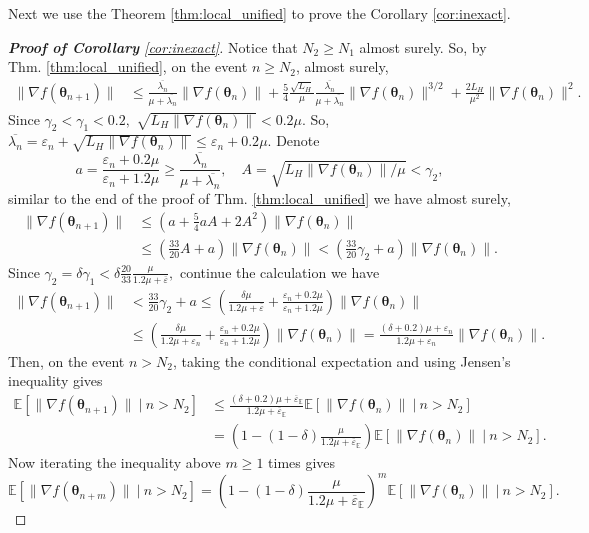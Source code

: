 \documentclass[11pt]{amsart}
\theoremstyle{plain}
\theoremstyle{definition}
\theoremstyle{remark}
\def\E{\mathbb{E}}
\def\eps{\varepsilon}
\def\param{\boldsymbol{\theta}}
\begin{document}
Next we use the Theorem \ref{thm:local_unified} to prove the Corollary \ref{cor:inexact}.
\begin{proof}[\textbf{Proof of Corollary} \ref{cor:inexact}]
Notice that $N_2\geq N_1$ almost surely. So, by Thm. \ref{thm:local_unified}, on the event $n\geq N_2$, almost surely,
\begin{align*}
\|\nabla f(\param_{n+1})\|&\leq \frac{\overline{\lambda_n}}{\mu+\overline{\lambda_n}}\|\nabla f(\param_n)\|+\frac{5}{4}\frac{\sqrt{L_H}}{\mu}\frac{\overline{\lambda_n}}{\mu+\overline{\lambda_n}}\|\nabla f(\param_n)\|^{3/2}+ \frac{2L_H}{\mu^2}\|\nabla f(\param_n)\|^2.
\end{align*}
Since $\gamma_2<\gamma_1<0.2,$ $\sqrt{L_H\|\nabla f(\param_n)\|}<0.2\mu.$ So, $\overline{\lambda_n}=\eps_n+\sqrt{L_H\|\nabla f(\param_n)\|}\leq \eps_n+0.2\mu.$
Denote 
\[
 a=\frac{\eps_n+0.2\mu}{\eps_n+1.2\mu}\geq \frac{\overline{\lambda_n}}{\mu+\overline{\lambda_n}}, \quad  A=\sqrt{L_H\|\nabla f(\param_n)\|/\mu}<\gamma_2,
 \]
 similar to the end of the proof of Thm. \ref{thm:local_unified} we have almost surely,
\begin{align*}
\|\nabla f(\param_{n+1})\|&\leq \left(a+\frac{5}{4}aA+2A^2\right)\|\nabla f(\param_n)\|\\
&\leq (\frac{33}{20}A+a)\|\nabla f(\param_n)\| < (\frac{33}{20}\gamma_2+a)\|\nabla f(\param_n)\|.
\end{align*}
Since $\gamma_2=\delta\gamma_1<\delta\frac{20}{33}\frac{\mu}{1.2\mu+\overline{\eps}},$ continue the calculation we have
\begin{align*}
\|\nabla f(\param_{n+1})\| &< \frac{33}{20}\gamma_2+a 
\leq (\frac{\delta\mu}{1.2\mu+\overline{\eps}}+\frac{\eps_n+0.2\mu}{\eps_n+1.2\mu})\|\nabla f(\param_n)\|\\
&\leq (\frac{\delta\mu}{1.2\mu+{\eps_n}}+\frac{\eps_n+0.2\mu}{\eps_n+1.2\mu})\|\nabla f(\param_n)\| =\frac{(\delta+0.2)\mu+\eps_n}{1.2\mu+\eps_n}\|\nabla f(\param_n)\|.
\end{align*}
Then, on the event $n> N_2$, taking the conditional expectation and using Jensen's inequality gives 
\begin{align*}
\E[\|\nabla f(\param_{n+1})\|\ |\  n>N_2]&\leq \frac{(\delta+0.2)\mu+\overline{\eps}_{\E}}{1.2\mu+\overline{\eps}_{\E}}\E[\|\nabla f(\param_{n})\|\ |\  n>N_2]\\
&=\left(1-(1-\delta)\frac{\mu}{1.2\mu+\overline{\eps}_{\E}}\right)\E[\|\nabla f(\param_{n})\|\ |\  n>N_2].
\end{align*}
Now iterating the inequality above $m\geq 1$ times gives 
\[
\E[\|\nabla f(\param_{n+m})\|\ |\  n>N_2]=\left(1-(1-\delta)\frac{\mu}{1.2\mu+\overline{\eps}_{\E}}\right)^m\E[\|\nabla f(\param_{n})\|\ |\  n>N_2].
\]
\end{proof}
\end{document}
